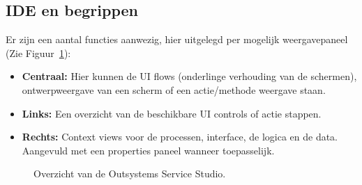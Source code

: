 \subsection{IDE en begrippen}
Er zijn een aantal functies aanwezig, hier uitgelegd per mogelijk weergavepaneel (Zie Figuur~\ref{fig:ide-overzicht}):
\begin{itemize}
    \item \textbf{Centraal:} Hier kunnen de UI flows (onderlinge verhouding van de schermen), ontwerpweergave van een scherm of een actie/methode weergave staan.
    \item \textbf{Links:} Een overzicht van de beschikbare UI controls of actie stappen.
    \item \textbf{Rechts:} Context views voor de processen, interface, de logica en de data. Aangevuld met een properties paneel wanneer toepasselijk.
\end{itemize}

\begin{figure}[h!]
     \caption{Overzicht van de Outsystems Service Studio.}
     \label{fig:ide-overzicht}
\end{figure}

